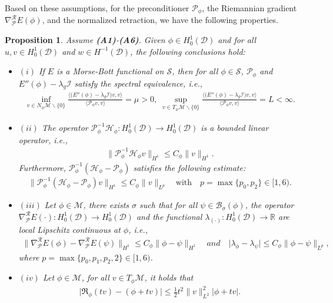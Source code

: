 \documentclass[preprint,3p]{elsarticle}
\newtheorem{prop}{Proposition}[section]
\begin{document}
Based on these assumptions, for the preconditioner $\mathcal{P}_{\phi}$, the Riemannian gradient $\nabla_{\mathcal{P}}^{\mathcal{R}}E(\phi)$, and the normalized retraction, we have the following properties.
\begin{prop}\label{Property-P}
	Assume {\rm \textbf{(A1)}}-{\rm \textbf{(A6)}}. Given $\phi\in H_0^1(\mathcal{D})$ and for all $u, v\in H_0^1(\mathcal{D})$ and $w\in H^{-1}(\mathcal{D})$, the following conclusions hold:
	\begin{itemize}[label={}, labelsep=0pt, leftmargin=*]
		\item $(i)$ If $E$ is a
		Morse-Bott functional on $\mathcal{S}$, then for all $\phi\in\mathcal{S}$, $\mathcal{P}_{\phi}$ and $E''(\phi)-\lambda_g\mathcal{I}$ satisfy the spectral equivalence, i.e.,
		\begin{align}\label{Mu-L}
			\inf_{v\in N_{\phi}\mathcal{M}\backslash\{0\}}\frac{\big\langle \big(E''(\phi)-\lambda_g\mathcal{I}\big)v,v\big\rangle}{\big\langle\mathcal{P}_{\phi}v,v\big\rangle}=\mu>0,\;\sup_{v\in T_{\phi}\mathcal{M}\backslash\{0\}}\frac{\big\langle \big(E''(\phi)-\lambda_g\mathcal{I}\big)v,v\big\rangle}{\big\langle\mathcal{P}_{\phi}v,v\big\rangle}=L<\infty.
		\end{align}
		\item $(ii)$ {The operator} $\mathcal{P}^{-1}_{\phi}\mathcal{H}_{\phi}:H_0^1(\mathcal{D})\to H_0^1(\mathcal{D})$ is a bounded linear operator, i.e., 
		\begin{align*}
			\big\|\mathcal{P}^{-1}_{\phi}\mathcal{H}_{\phi}v\big\|_{H^1}\le C_{\phi}\|v\|_{H^{1}}.
		\end{align*}
		Furthermore, $\mathcal{P}_{\phi}^{-1}(\mathcal{H}_{\phi}-\mathcal{P}_{\phi})$ satisfies the following estimate:
		\begin{align*}
			\big\|\mathcal{P}_{\phi}^{-1}(\mathcal{H}_{\phi}-\mathcal{P}_{\phi})v\big\|_{H^1}\le C_{\phi}\|v\|_{L^{p}}\quad\text{with}\quad {p=\max\{p_0,p_2\}\in[1,6)}.
		\end{align*}
		\item $(iii)$ Let $\phi\in\mathcal{M}$, there exists $\sigma$ such that for all $\psi\in\mathcal{B}_{\sigma}(\phi)$, the operator $\nabla^{\mathcal{R}}_{\mathcal{P}} E(\cdot):H_0^1(\mathcal{D})\to H_0^1(\mathcal{D})$ and the functional $\lambda_{(\cdot)}:H^1_0(\mathcal{D})\to \mathbb{R}$ are local Lipschitz continuous at $\phi$, i.e., 
		\begin{align*}
			\big\|\nabla^{\mathcal{R}}_{\mathcal{P}} E(\phi)-\nabla^{\mathcal{R}}_{\mathcal{P}} E(\psi)\big\|_{H^1}\le C_{\phi}\|\phi-\psi\|_{H^1}\quad and\quad \big|\lambda_{\phi}-\lambda_{\psi}\big|\le C_{\phi}\|\phi-\psi\|_{L^p},
		\end{align*}
		where $p=\max\{p_0,p_1,p_2,2\}\in[1,6)$.
		\item $(iv)$ Let $\phi\in\mathcal{M}$, for all $v\in T_{\phi}\mathcal{M}$, it holds that
		\begin{align*}
			\big|\mathfrak{R}_{\phi}(tv)-(\phi+tv)\big|\le\frac{1}{2}t^2\|v\|^2_{L^2}|\phi+tv|.
		\end{align*}
	\end{itemize}
\end{prop}
\end{document}
